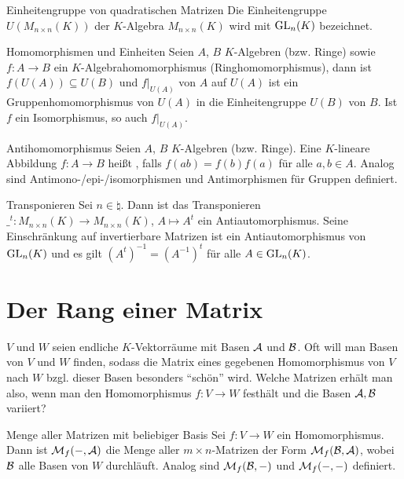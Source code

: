 \begin{Def}{Einheitengruppe von quadratischen Matrizen}
    Die Einheitengruppe $U(M_{n \times n}(K))$ der $K$-Algebra $M_{n \times n}(K)$
    wird mit $\operatorname{GL}_n(K)$ bezeichnet.
\end{Def}

\begin{Satz}{Homomorphismen und Einheiten}
    Seien $A$, $B$ $K$-Algebren (bzw. Ringe) sowie $f: A \rightarrow B$
    ein $K$-Algebrahomomorphismus (Ringhomomorphismus),
    dann ist $f(U(A)) \subseteq U(B)$ und $f|_{U(A)}$ von $A$ auf $U(A)$ ist
    ein Gruppenhomomorphismus von $U(A)$ in die Einheitengruppe $U(B)$ von $B$.
    Ist $f$ ein Isomorphismus, so auch $f|_{U(A)}$.
\end{Satz}

\begin{Def}{Antihomomorphismus}
    Seien $A$, $B$ $K$-Algebren (bzw. Ringe).
    Eine $K$-lineare Abbildung $f: A \rightarrow B$ heißt
    ,
    falls $f(ab) = f(b)f(a)$ für alle $a, b \in A$.
    Analog sind Antimono-/epi-/isomorphismen und Antimorphismen für Gruppen
    definiert.
\end{Def}

\begin{Satz}{Transponieren}
    Sei $n \in \natural$.
    Dann ist das Transponieren
    $\_^t: M_{n \times n}(K) \rightarrow M_{n \times n}(K)$, $A \mapsto A^t$
    ein Antiautomorphismus.
    Seine Einschränkung auf invertierbare Matrizen ist ein Antiautomorphismus
    von $\operatorname{GL}_n(K)$ und es gilt $(A^t)^{-1} = (A^{-1})^t$ für alle
    $A \in \operatorname{GL}_n(K)$.
\end{Satz}

\section{%
    Der Rang einer Matrix%
}

\begin{Bem}
    $V$ und $W$ seien endliche $K$-Vektorräume mit Basen $\mathcal{A}$ und
    $\mathcal{B}$.
    Oft will man Basen von $V$ und $W$ finden, sodass die Matrix eines
    gegebenen Homomorphismus von $V$ nach $W$ bzgl. dieser Basen besonders
    "`schön"' wird.
    Welche Matrizen erhält man also, wenn man den Homomorphismus
    $f: V \rightarrow W$ festhält und die Basen $\mathcal{A}, \mathcal{B}$
    variiert?
\end{Bem}

\begin{Def}{Menge aller Matrizen mit beliebiger Basis}
    Sei $f: V \rightarrow W$ ein Homomorphismus.
    Dann ist $\mathcal{M}_{f}(\mathcal{-},\mathcal{A})$ die Menge aller $m \times n$-Matrizen
    der Form $\mathcal{M}_{f}(\mathcal{B},\mathcal{A})$, wobei $\mathcal{B}$ alle Basen von $W$
    durchläuft.
    Analog sind $\mathcal{M}_{f}(\mathcal{B},\mathcal{-})$ und $\mathcal{M}_{f}(\mathcal{-},\mathcal{-})$ definiert.
\end{Def}

